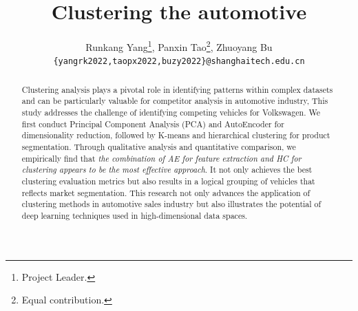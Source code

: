 \documentclass{article} %
\title{Clustering the automotive}
\author{Runkang Yang\thanks{Project Leader.}, Panxin Tao\thanks{Equal contribution.}, Zhuoyang Bu\footnotemark[2]\\
\texttt{\{yangrk2022,taopx2022,buzy2022\}@shanghaitech.edu.cn}}
\newcommand{\purpletext}[1]{\textcolor{purple!75!black}{#1}}
\begin{document}
\maketitle


\begin{abstract}
   Clustering analysis plays a pivotal role in identifying patterns within complex datasets and can be particularly valuable for competitor analysis in automotive industry, 
   This study addresses the challenge of identifying competing vehicles for Volkswagen.
   We first conduct Principal Component Analysis (PCA) and AutoEncoder for dimensionality reduction, followed by K-means and hierarchical clustering for product segmentation. 
   Through qualitative analysis and quantitative comparison, we empirically find that \textit{the combination of AE for feature extraction and HC for clustering appears to be the most effective approach}. It not only achieves the \purpletext{best clustering evaluation metrics} but also results in a logical grouping of vehicles that reflects market segmentation.
   This research not only advances the application of clustering methods in automotive sales industry but also illustrates the potential of deep learning techniques used in high-dimensional data spaces.
\end{abstract}
\end{document}

